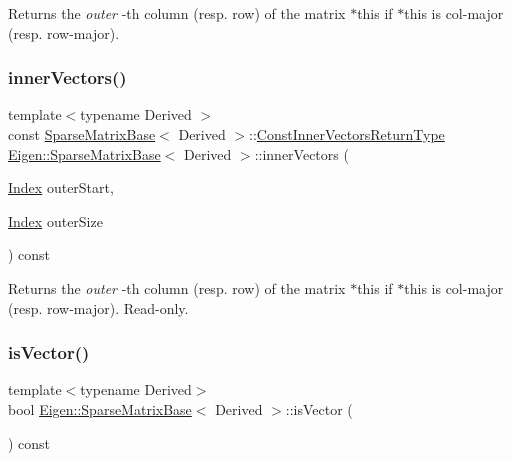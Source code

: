 \begin{DoxyReturn}{Returns}
the {\itshape outer} -\/th column (resp. row) of the matrix {\ttfamily $\ast$this} if {\ttfamily $\ast$this} is col-\/major (resp. row-\/major). 
\end{DoxyReturn}
\mbox{\label{class_eigen_1_1_sparse_matrix_base_ae6585c991d04c139f2486ab81f56ad1a}} 
\subsubsection{\texorpdfstring{innerVectors()}{innerVectors()}\hspace{0.1cm}{\footnotesize\ttfamily [2/2]}}
{\footnotesize\ttfamily template$<$typename Derived $>$ \\
const \mbox{\hyperlink{class_eigen_1_1_sparse_matrix_base}{Sparse\+Matrix\+Base}}$<$ Derived $>$\+::\mbox{\hyperlink{class_eigen_1_1_block}{Const\+Inner\+Vectors\+Return\+Type}} \mbox{\hyperlink{class_eigen_1_1_sparse_matrix_base}{Eigen\+::\+Sparse\+Matrix\+Base}}$<$ Derived $>$\+::inner\+Vectors (\begin{DoxyParamCaption}\item[{\mbox{\hyperlink{struct_eigen_1_1_eigen_base_a554f30542cc2316add4b1ea0a492ff02}{Index}}}]{outer\+Start,  }\item[{\mbox{\hyperlink{struct_eigen_1_1_eigen_base_a554f30542cc2316add4b1ea0a492ff02}{Index}}}]{outer\+Size }\end{DoxyParamCaption}) const}

\begin{DoxyReturn}{Returns}
the {\itshape outer} -\/th column (resp. row) of the matrix {\ttfamily $\ast$this} if {\ttfamily $\ast$this} is col-\/major (resp. row-\/major). Read-\/only. 
\end{DoxyReturn}
\mbox{\label{class_eigen_1_1_sparse_matrix_base_a7eedffa867031f649fd0fb9cc23ce4be}} 
\subsubsection{\texorpdfstring{isVector()}{isVector()}}
{\footnotesize\ttfamily template$<$typename Derived$>$ \\
bool \mbox{\hyperlink{class_eigen_1_1_sparse_matrix_base}{Eigen\+::\+Sparse\+Matrix\+Base}}$<$ Derived $>$\+::is\+Vector (\begin{DoxyParamCaption}{ }\end{DoxyParamCaption}) const\hspace{0.3cm}{\ttfamily [inline]}}

